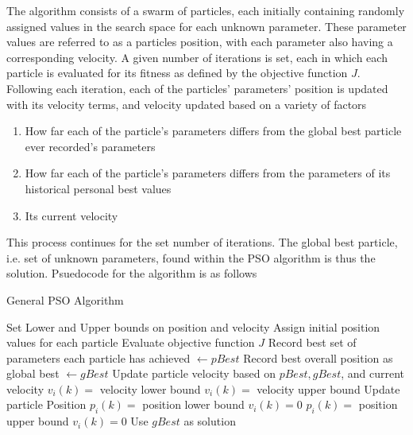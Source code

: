 The algorithm consists of a swarm of particles, each initially containing randomly assigned values in the search space for each unknown
parameter. These parameter values are referred to as a particles position, with each parameter also having a corresponding velocity. A given number of iterations is set, each in which
each particle is evaluated for its fitness as defined by the objective function $J$. Following each iteration, each of the particles' parameters' position is updated with its velocity terms,
and velocity updated based on a variety of factors
\begin{enumerate}
    \item How far each of the particle's parameters differs from the global best particle ever recorded's parameters
    \item How far each of the particle's parameters differs from the parameters of its historical personal best values
    \item Its current velocity
\end{enumerate}

\noindent This process continues for the set number of iterations. The global best particle, i.e. set of unknown parameters, found 
within the PSO algorithm is thus the solution. Psuedocode for the algorithm is as follows

\begin{algorithm}[H]
    \caption{General PSO Algorithm}
    \begin{algorithmic}
    
    \STATE Set Lower and Upper bounds on position and velocity
    \STATE Assign initial position values for each particle
    \ENDFOR
    \STATE Evaluate objective function $J$
    \ENDFOR
    \STATE Record best set of parameters each particle has achieved $\leftarrow pBest$
    \STATE Record best overall position as global best $\leftarrow gBest$
    \STATE Update particle velocity based on $pBest, gBest$, and current velocity
    \STATE $v_i(k) = $ velocity lower bound
    \STATE $v_i(k) = $ velocity upper bound
    \ENDIF
    \STATE Update particle Position
    \STATE $p_i(k) = $ position lower bound
    \STATE $v_i(k) = 0$
    \STATE $p_i(k) = $ position upper bound
    \STATE $v_i(k) = 0$
    \ENDIF
    \ENDFOR
    \ENDFOR
    \STATE Use $gBest$ as solution
    \end{algorithmic}

\end{algorithm}
